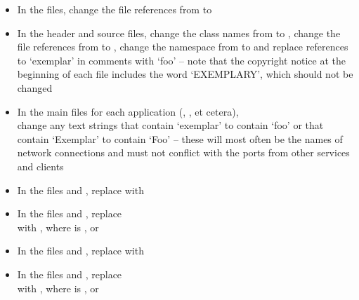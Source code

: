\begin{itemize}
\item In the  files, change the file references from
 to 
\item In the  header and source files, change the class names from
 to , change the file references from
 to , change the namespace from
 to  and replace references to `exemplar' in comments with
`foo' -- note that the copyright notice at the beginning of each file includes the word
`EXEMPLARY', which should not be changed
\item In the main files for each application (,
, et cetera),\\
change any text strings that contain `exemplar' to contain `foo' or that contain
`Exemplar' to contain `Foo' -- these will most often be the names of \yarp{} network
connections and must not conflict with the ports from other services and clients
\item In the files  and , replace
 with
\item In the files  and
, replace\\
 with
,
where  is ,  or 
\item In the files  and , replace
with 
\item In the files  and ,
replace\\
with ,
where  is ,  or 

\end{itemize}
